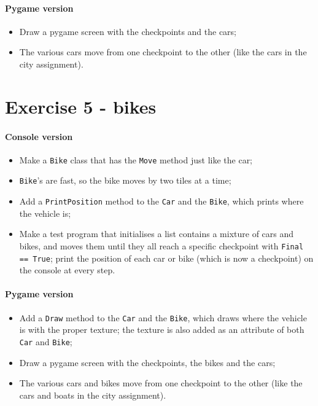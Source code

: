 \documentclass[12pt,a4paper]{article}
\begin{document}
		\paragraph*{Pygame version}
			\begin{itemize}
				\item Draw a pygame screen with the checkpoints and the cars;
				\item The various cars move from one checkpoint to the other (like the cars in the city assignment).
			\end{itemize}

	\section{Exercise 5 - bikes}
		\paragraph*{Console version}
		\begin{itemize}
			\item Make a \texttt{Bike} class that has the \texttt{Move} method just like the car;
			\item \texttt{Bike}'s are fast, so the bike moves by two tiles at a time;
			\item Add a \texttt{PrintPosition} method to the \texttt{Car} and the \texttt{Bike}, which prints where the vehicle is;
			\item Make a test program that initialises a list contains a mixture of cars and bikes, and moves them until they all reach a specific checkpoint with \texttt{Final == True}; print the position of each car or bike (which is now a checkpoint) on the console at every step.
		\end{itemize}
		
		\paragraph*{Pygame version}
		\begin{itemize}
			\item Add a \texttt{Draw} method to the \texttt{Car} and the \texttt{Bike}, which draws where the vehicle is with the proper texture; the texture is also added as an attribute of both \texttt{Car} and \texttt{Bike};
			\item Draw a pygame screen with the checkpoints, the bikes and the cars;
			\item The various cars and bikes move from one checkpoint to the other (like the cars and boats in the city assignment).
		\end{itemize}
	
\end{document}
